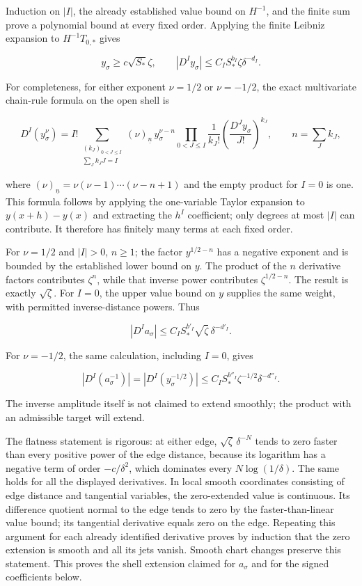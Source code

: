 \documentclass[10pt,a4paper]{article}
\begin{document}
Induction on \(|I|\), the already established value bound on \(H^{-1}\), and the finite sum prove a polynomial bound at every fixed order. Applying the finite Leibniz expansion to \(H^{-1}T_{0,*}\) gives

\[
y_\sigma\ge c\sqrt{S_*}\zeta,
\qquad |D^Iy_\sigma|\le C_IS_*^{b_I}\zeta\delta^{-d_I}.
\]

For completeness, for either exponent \(\nu=1/2\) or \(\nu=-1/2\), the exact multivariate chain-rule formula on the open shell is

\[
D^I(y_\sigma^\nu)=I!\sum_{\substack{(k_J)_{0<J\le I}\\
\sum_J k_JJ=I}}
(\nu)_{\underline n}\,y_\sigma^{\nu-n}
\prod_{0<J\le I}\frac1{k_J!}
\left(\frac{D^Jy_\sigma}{J!}\right)^{k_J},
\qquad n=\sum_Jk_J,
\]

where \((\nu)_{\underline n}=\nu(\nu-1)\cdots(\nu-n+1)\) and the empty product for \(I=0\) is one. This formula follows by applying the one-variable Taylor expansion to \(y(x+h)-y(x)\) and extracting the \(h^I\) coefficient; only degrees at most \(|I|\) can contribute. It therefore has finitely many terms at each fixed order.

For \(\nu=1/2\) and \(|I|>0\), \(n\ge1\); the factor \(y^{1/2-n}\) has a negative exponent and is bounded by the established lower bound on \(y\). The product of the \(n\) derivative factors contributes \(\zeta^n\), while that inverse power contributes \(\zeta^{1/2-n}\). The result is exactly \(\sqrt\zeta\). For \(I=0\), the upper value bound on \(y\) supplies the same weight, with permitted inverse-distance powers. Thus

\[
|D^Ia_\sigma|\le C_IS_*^{b'_I}\sqrt\zeta\,\delta^{-d'_I}.
\]

For \(\nu=-1/2\), the same calculation, including \(I=0\), gives

\[
|D^I(a_\sigma^{-1})|=|D^I(y_\sigma^{-1/2})|
\le C_IS_*^{b''_I}\zeta^{-1/2}\delta^{-d''_I}.
\]

The inverse amplitude itself is not claimed to extend smoothly; the product with an admissible target will extend.

The flatness statement is rigorous: at either edge, \(\sqrt\zeta\,\delta^{-N}\) tends to zero faster than every positive power of the edge distance, because its logarithm has a negative term of order \(-c/\delta^2\), which dominates every \(N\log(1/\delta)\). The same holds for all the displayed derivatives. In local smooth coordinates consisting of edge distance and tangential variables, the zero-extended value is continuous. Its difference quotient normal to the edge tends to zero by the faster-than-linear value bound; its tangential derivative equals zero on the edge. Repeating this argument for each already identified derivative proves by induction that the zero extension is smooth and all its jets vanish. Smooth chart changes preserve this statement. This proves the shell extension claimed for \(a_\sigma\) and for the signed coefficients below.
\end{document}
